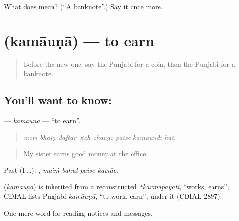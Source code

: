\begin{tcolorbox}[breakable,colback=teal!4,colframe=teal!35!black,title={Before you move on}]
What does  mean? (\textquotedblleft{}A banknote\textquotedblright{}.) Say it once more.
\end{tcolorbox}
\section[\texorpdfstring{\pa{ਕਮਾਉਣਾ} (kamāuṇā)}{ਕਮਾਉਣਾ (kamāuṇā)}]{ (kamāuṇā) — to earn}

\label{lesson:PA-C258-kamauna}



\begin{quote}
Before the new one: say the Punjabi for a coin, then the Punjabi for a banknote.
\end{quote}

\subsection*{You'll want to know: }
\textbf{} — \emph{kamāuṇā} — \textquotedblleft{}to earn\textquotedblright{}.

\begin{quote}
       
\end{quote}

\begin{quote}
\emph{merī bhaiṇ daftar vich chaṅge paise kamāundī hai.}
\end{quote}

\begin{quote}
My sister earns good money at the office.
\end{quote}

Past (I …):    , \emph{maiṁ bahut paise kamāe}.

\begin{cousinweb}
\textbf{} (\emph{kamāuṇā}) is inherited from a reconstructed \emph{*karmāpayati}, \textquotedblleft{}works, earns\textquotedblright{}; CDIAL lists Punjabi \emph{kamāuṇā}, \textquotedblleft{}to work, earn\textquotedblright{}, under it (CDIAL 2897).
\end{cousinweb}

\begin{grammarlens}[title={What you've built}]
One more word for reading notices and messages.
\end{grammarlens}

